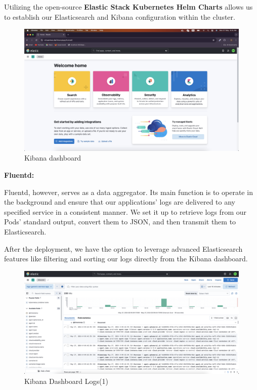 Utilizing the open-source \textbf{Elastic Stack Kubernetes Helm Charts} allows us to establish our Elasticsearch and Kibana configuration within the cluster.

\begin{figure}[H]
  \centering
  \includegraphics[width=1\textwidth]{src/assets/chapters/elastic.png}
  \caption{Kibana dashboard}
  \label{fig:kibana-dash}
\end{figure}


\textbf{Fluentd:}


Fluentd, however, serves as a data aggregator. Its main function is to operate in the background and ensure that our applications' logs are delivered to any specified service in a consistent manner. We set it up to retrieve logs from our Pods' standard output, convert them to JSON, and then transmit them to Elasticsearch.

After the deployment, we have the option to leverage advanced Elasticsearch features like filtering and sorting our logs directly from the Kibana dashboard.

\begin{figure}[H]
  \centering
  \includegraphics[width=1\textwidth]{src/assets/chapters/kibanalogs1.png}
  \caption{Kibana Dashboard Logs(1)}
  \label{fig:kibana-dash-logs-1}
\end{figure}


